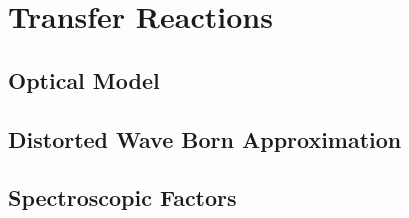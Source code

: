 \section{Transfer Reactions}



\subsection{Optical Model}

\subsection{Distorted Wave Born Approximation}

\subsection{Spectroscopic Factors}

\subsection{}